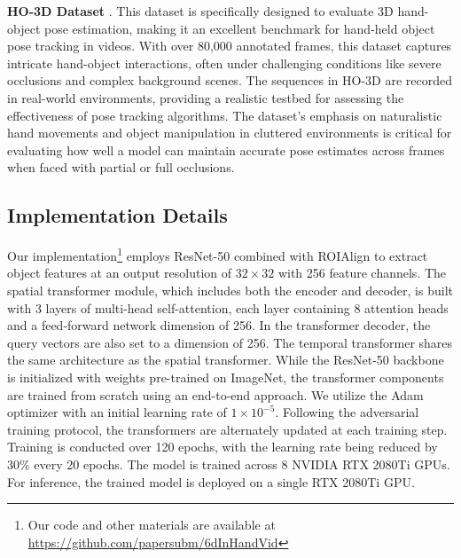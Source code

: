\noindent \textbf{HO-3D Dataset} \cite{hampali2020honnotate}. This dataset is specifically designed to evaluate 3D hand-object pose estimation, making it an excellent benchmark for hand-held object pose tracking in videos. With over 80,000 annotated frames, this dataset captures intricate hand-object interactions, often under challenging conditions like severe occlusions and complex background scenes. The sequences in HO-3D are recorded in real-world environments, providing a realistic testbed for assessing the effectiveness of pose tracking algorithms. The dataset's emphasis on naturalistic hand movements and object manipulation in cluttered environments is critical for evaluating how well a model can maintain accurate pose estimates across frames when faced with partial or full occlusions.

\subsection{Implementation Details}

Our implementation\footnote{Our code and other materials are available at \url{https://github.com/papersubm/6dInHandVid}} employs ResNet-50 \cite{he2016deep} combined with ROIAlign \cite{he2017mask} to extract object features at an output resolution of $32 \times 32$ with 256 feature channels. The spatial transformer module, which includes both the encoder and decoder, is built with 3 layers of multi-head self-attention, each layer containing 8 attention heads and a feed-forward network dimension of 256. In the transformer decoder, the query vectors are also set to a dimension of 256. The temporal transformer shares the same architecture as the spatial transformer. While the ResNet-50 backbone is initialized with weights pre-trained on ImageNet, the transformer components are trained from scratch using an end-to-end approach. We utilize the Adam optimizer with an initial learning rate of $1 \times 10^{-5}$. Following the adversarial training protocol, the transformers are alternately updated at each training step. Training is conducted over 120 epochs, with the learning rate being reduced by 30\% every 20 epochs. The model is trained across 8 NVIDIA RTX 2080Ti GPUs. For inference, the trained model is deployed on a single RTX 2080Ti GPU.

